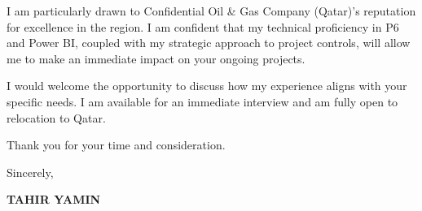 \documentclass[11pt,a4paper]{article}
\begin{document}
I am particularly drawn to Confidential Oil \& Gas Company (Qatar)'s reputation for excellence in the region. I am confident that my technical proficiency in P6 and Power BI, coupled with my strategic approach to project controls, will allow me to make an immediate impact on your ongoing projects.

I would welcome the opportunity to discuss how my experience aligns with your specific needs. I am available for an immediate interview and am fully open to relocation to Qatar.

Thank you for your time and consideration.

\vspace{0.5cm}
Sincerely,

\vspace{0.5cm}
\textbf{TAHIR YAMIN}
\end{document}
